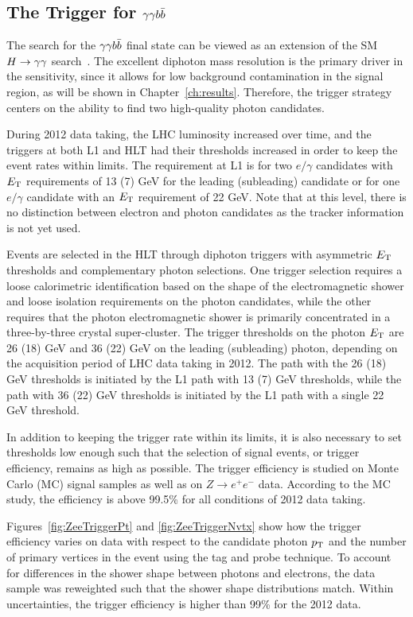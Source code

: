\subsection{The Trigger for $\gamma\gamma b\bar{b}$}

The search for the $\gamma\gamma b\bar{b}$ final state can be viewed as an extension of the
SM $H\to\gamma\gamma$ search~\cite{HggCMSpaper}. The excellent diphoton mass
resolution is the primary driver in the sensitivity, since it allows for low background contamination
in the signal region, as will be shown in Chapter~\ref{ch:results}.
Therefore, the trigger strategy centers on the ability to find two high-quality photon candidates.

During 2012 data taking, the LHC luminosity increased over time, and the triggers at both L1 and HLT
had their thresholds increased in order to keep the event rates within limits.
The requirement at L1 is for two $e/\gamma$ candidates with $E_{\rm T}$ requirements of 13 (7) GeV
for the leading (subleading) candidate or for one $e/\gamma$ candidate with an $E_{\rm T}$ requirement
of 22 GeV. Note that at this level, there is no distinction between electron and photon candidates as
the tracker information is not yet used.

Events are selected in the HLT through diphoton triggers with asymmetric $E_{\rm T}$ thresholds
and complementary photon selections. One trigger selection requires a loose calorimetric
identification based on the shape of the electromagnetic shower and loose isolation requirements
on the photon candidates, while the other requires that the photon electromagnetic shower
is primarily concentrated in a three-by-three crystal super-cluster.
The trigger thresholds on the photon $E_{\rm T}$ are 26 (18) GeV and 36 (22) GeV on the leading
(subleading) photon, depending on the acquisition period of LHC data taking in 2012.
The path with the 26 (18) GeV thresholds is initiated by the L1 path with 13 (7) GeV thresholds, while
the path with 36 (22) GeV thresholds is initiated by the L1 path with a single 22 GeV threshold.

In addition to keeping the trigger rate within its limits, it is also necessary to set thresholds
low enough such that the selection of signal events, or trigger efficiency,
remains as high as possible. The trigger efficiency
is studied on Monte Carlo (MC) signal samples as well as on $Z\rightarrow e^+ e^-$ data.
According to the MC study, the efficiency is above 99.5\% for all conditions of 2012 data taking.

Figures~\ref{fig:ZeeTriggerPt} and \ref{fig:ZeeTriggerNvtx}
show how the trigger efficiency varies on data with respect to the
candidate photon $p_{\rm T}$ and the number of primary vertices in the event
using the tag and probe technique. To account for differences
in the shower shape between photons and electrons, the data sample was reweighted such that the shower
shape distributions match.
Within uncertainties, the trigger efficiency is higher than 99\% for the 2012 data.

